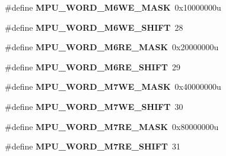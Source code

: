 \begin{DoxyCompactItemize}
\item 
\hypertarget{group___m_p_u___register___masks_ga954333596403a1acfee73052cb5ea1f9}{}\#define {\bfseries M\+P\+U\+\_\+\+W\+O\+R\+D\+\_\+\+M6\+W\+E\+\_\+\+M\+A\+S\+K}~0x10000000u\label{group___m_p_u___register___masks_ga954333596403a1acfee73052cb5ea1f9}

\item 
\hypertarget{group___m_p_u___register___masks_ga1cd57764e1dc69513f0bb0bb63c7ca44}{}\#define {\bfseries M\+P\+U\+\_\+\+W\+O\+R\+D\+\_\+\+M6\+W\+E\+\_\+\+S\+H\+I\+F\+T}~28\label{group___m_p_u___register___masks_ga1cd57764e1dc69513f0bb0bb63c7ca44}

\item 
\hypertarget{group___m_p_u___register___masks_gaea71b8ad714cf0bc8e007cca8a9a6fd4}{}\#define {\bfseries M\+P\+U\+\_\+\+W\+O\+R\+D\+\_\+\+M6\+R\+E\+\_\+\+M\+A\+S\+K}~0x20000000u\label{group___m_p_u___register___masks_gaea71b8ad714cf0bc8e007cca8a9a6fd4}

\item 
\hypertarget{group___m_p_u___register___masks_ga302e27597edfb853b8d08552c27d4a17}{}\#define {\bfseries M\+P\+U\+\_\+\+W\+O\+R\+D\+\_\+\+M6\+R\+E\+\_\+\+S\+H\+I\+F\+T}~29\label{group___m_p_u___register___masks_ga302e27597edfb853b8d08552c27d4a17}

\item 
\hypertarget{group___m_p_u___register___masks_gab63d3094e6173e76e2df25ce9faca8a0}{}\#define {\bfseries M\+P\+U\+\_\+\+W\+O\+R\+D\+\_\+\+M7\+W\+E\+\_\+\+M\+A\+S\+K}~0x40000000u\label{group___m_p_u___register___masks_gab63d3094e6173e76e2df25ce9faca8a0}

\item 
\hypertarget{group___m_p_u___register___masks_ga38c58ef487241b3084e6df9b7d6e316e}{}\#define {\bfseries M\+P\+U\+\_\+\+W\+O\+R\+D\+\_\+\+M7\+W\+E\+\_\+\+S\+H\+I\+F\+T}~30\label{group___m_p_u___register___masks_ga38c58ef487241b3084e6df9b7d6e316e}

\item 
\hypertarget{group___m_p_u___register___masks_gad6a0ce43c3940a0870853a8601402248}{}\#define {\bfseries M\+P\+U\+\_\+\+W\+O\+R\+D\+\_\+\+M7\+R\+E\+\_\+\+M\+A\+S\+K}~0x80000000u\label{group___m_p_u___register___masks_gad6a0ce43c3940a0870853a8601402248}

\item 
\hypertarget{group___m_p_u___register___masks_gab8b7a9573658248eaba1a55f660f8ca1}{}\#define {\bfseries M\+P\+U\+\_\+\+W\+O\+R\+D\+\_\+\+M7\+R\+E\+\_\+\+S\+H\+I\+F\+T}~31\label{group___m_p_u___register___masks_gab8b7a9573658248eaba1a55f660f8ca1}


\end{DoxyCompactItemize}
